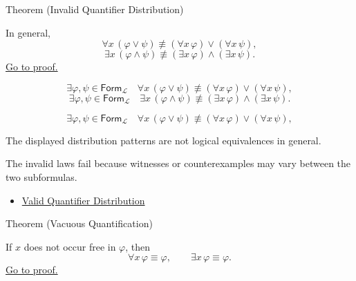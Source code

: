 \begin{theorembox}{Theorem (Invalid Quantifier Distribution)}
\begin{theorem}
\label{thm:invalid-quantifier-distribution}
In general,
\[
\forall x\,(\varphi\lor\psi)
\not\equiv
(\forall x\,\varphi)\lor(\forall x\,\psi),
\]
\[
\exists x\,(\varphi\land\psi)
\not\equiv
(\exists x\,\varphi)\land(\exists x\,\psi).
\]
\hyperref[prf:invalid-quantifier-distribution]{Go to proof.}
\end{theorem}
\end{theorembox}

\begin{remark*}
\[
\exists \varphi,\psi\in\mathsf{Form}_{\mathcal L}\quad
\forall x\,(\varphi\lor\psi)
\not\equiv
(\forall x\,\varphi)\lor(\forall x\,\psi),
\]
\[
\exists \varphi,\psi\in\mathsf{Form}_{\mathcal L}\quad
\exists x\,(\varphi\land\psi)
\not\equiv
(\exists x\,\varphi)\land(\exists x\,\psi).
\]
\end{remark*}

\begin{remark*}
\[
\exists \varphi,\psi\in\mathsf{Form}_{\mathcal L}\quad
\forall x\,(\varphi\lor\psi)
\not\equiv
(\forall x\,\varphi)\lor(\forall x\,\psi),
\]

The displayed distribution patterns are not logical equivalences in general.
\end{remark*}

\begin{remark*}[Interpretation]
The invalid laws fail because witnesses or counterexamples may vary between
the two subformulas.
\end{remark*}

\begin{dependencies}
\begin{itemize}
  \item \hyperref[thm:qdist]{Valid Quantifier Distribution}
\end{itemize}
\end{dependencies}

\begin{theorembox}{Theorem (Vacuous Quantification)}
\begin{theorem}
\label{thm:vacuous}
If \(x\) does not occur free in \(\varphi\), then
\[
\forall x\,\varphi\equiv\varphi,
\qquad
\exists x\,\varphi\equiv\varphi.
\]
\hyperref[prf:vacuous]{Go to proof.}
\end{theorem}
\end{theorembox}

